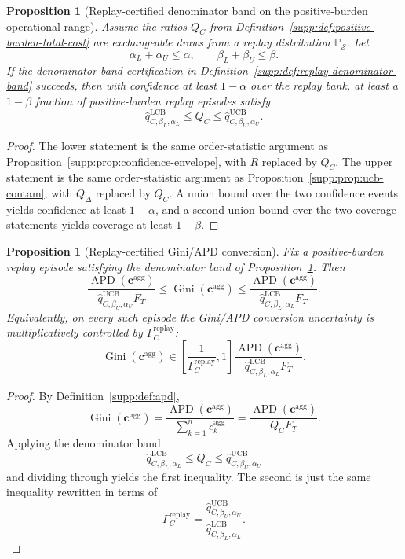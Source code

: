 \documentclass[11pt]{article}
\newcommand{\Prob}{\mathbb{P}}
\newcommand{\1}{\mathbf{1}}
\newcommand{\Gini}{\operatorname{Gini}}
\newcommand{\APD}{\operatorname{APD}}
\theoremstyle{definition}
\theoremstyle{plain}
\newtheorem{proposition}[definition]{Proposition}
\theoremstyle{remark}
\begin{document}
\begin{proposition}[Replay-certified denominator band on the positive-burden operational range]
\label{supp:prop:replay-denominator-band}
Assume the ratios $Q_C$ from Definition~\ref{supp:def:positive-burden-total-cost} are exchangeable draws from a replay distribution $\Prob_{\mathcal S}$. Let
\[
\alpha_L+\alpha_U\le \alpha,
\qquad
\beta_L+\beta_U\le \beta.
\]
If the denominator-band certification in Definition~\ref{supp:def:replay-denominator-band} succeeds, then with confidence at least $1-\alpha$ over the replay bank, at least a $1-\beta$ fraction of positive-burden replay episodes satisfy
\[
\widehat q_{C,\beta_L,\alpha_L}^{\mathrm{LCB}}
\le
Q_C
\le
\widehat q_{C,\beta_U,\alpha_U}^{\mathrm{UCB}}.
\]
\end{proposition}

\begin{proof}
The lower statement is the same order-statistic argument as Proposition~\ref{supp:prop:confidence-envelope}, with $R$ replaced by $Q_C$. The upper statement is the same order-statistic argument as Proposition~\ref{supp:prop:ucb-contam}, with $Q_\Delta$ replaced by $Q_C$. A union bound over the two confidence events yields confidence at least $1-\alpha$, and a second union bound over the two coverage statements yields coverage at least $1-\beta$.
\end{proof}

\begin{proposition}[Replay-certified Gini/APD conversion]
\label{supp:prop:gini-apd-conversion}
Fix a positive-burden replay episode satisfying the denominator band of Proposition~\ref{supp:prop:replay-denominator-band}. Then
\[
\frac{\APD(\mathbf c^{\mathrm{agg}})}{\widehat q_{C,\beta_U,\alpha_U}^{\mathrm{UCB}} F_T}
\le
\Gini(\mathbf c^{\mathrm{agg}})
\le
\frac{\APD(\mathbf c^{\mathrm{agg}})}{\widehat q_{C,\beta_L,\alpha_L}^{\mathrm{LCB}} F_T}.
\]
Equivalently, on every such episode the Gini/APD conversion uncertainty is multiplicatively controlled by $\Gamma_C^{\mathrm{replay}}$:
\[
\Gini(\mathbf c^{\mathrm{agg}})
\in
\left[
\frac{1}{\Gamma_C^{\mathrm{replay}}},1
\right]
\frac{\APD(\mathbf c^{\mathrm{agg}})}{\widehat q_{C,\beta_L,\alpha_L}^{\mathrm{LCB}} F_T}.
\]
\end{proposition}

\begin{proof}
By Definition~\ref{supp:def:apd},
\[
\Gini(\mathbf c^{\mathrm{agg}})
=
\frac{\APD(\mathbf c^{\mathrm{agg}})}{\sum_{k=1}^n c_k^{\mathrm{agg}}}
=
\frac{\APD(\mathbf c^{\mathrm{agg}})}{Q_C F_T}.
\]
Applying the denominator band
\[
\widehat q_{C,\beta_L,\alpha_L}^{\mathrm{LCB}}
\le
Q_C
\le
\widehat q_{C,\beta_U,\alpha_U}^{\mathrm{UCB}}
\]
and dividing through yields the first inequality. The second is just the same inequality rewritten in terms of
\[
\Gamma_C^{\mathrm{replay}}
=
\frac{\widehat q_{C,\beta_U,\alpha_U}^{\mathrm{UCB}}}{\widehat q_{C,\beta_L,\alpha_L}^{\mathrm{LCB}}}.
\]
\end{proof}
\end{document}
